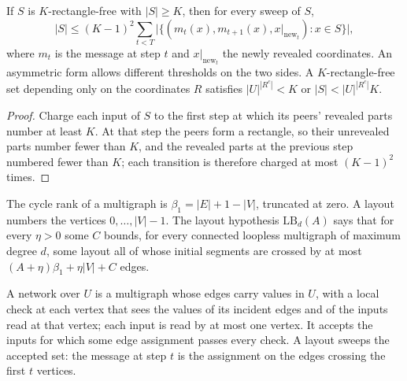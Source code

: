 \begin{lemma}
  \label{lem:lowerbounds-frontier-counting}
  \leanok
  If $S$ is $K$-rectangle-free with $|S|\ge K$, then for every sweep of $S$,
  \[
    |S| \le (K-1)^2 \sum_{t<T} \bigl|\{(m_t(x), m_{t+1}(x), x|_{\text{new}_t}) : x\in S\}\bigr|,
  \]
  where $m_t$ is the message at step $t$ and $x|_{\text{new}_t}$ the newly
  revealed coordinates. An asymmetric form allows different thresholds on the two
  sides. A $K$-rectangle-free set depending only on the coordinates $R$ satisfies
  $|U|^{|R^c|}<K$ or $|S|<|U|^{|R^c|}K$.
\end{lemma}
\begin{proof}
  \leanok
  Charge each input of $S$ to the first step at which its peers' revealed parts
  number at least $K$. At that step the peers form a rectangle, so their
  unrevealed parts number fewer than $K$, and the revealed parts at the previous
  step numbered fewer than $K$; each transition is therefore charged at most
  $(K-1)^2$ times.
\end{proof}

\begin{definition}
  \label{def:lowerbounds-frontier-layout-bound}
  \leanok
  The cycle rank of a multigraph is $\beta_1=|E|+1-|V|$, truncated at zero. A layout
  numbers the vertices $0,\dots,|V|-1$. The layout hypothesis
  $\mathrm{LB}_d(A)$ says that for every $\eta>0$ some $C$ bounds, for every
  connected loopless multigraph of maximum degree $d$, some layout all of whose
  initial segments are crossed by at most $(A+\eta)\beta_1+\eta|V|+C$ edges.
\end{definition}

\begin{definition}
  \label{def:lowerbounds-frontier-network}
  \leanok
  A network over $U$ is a multigraph whose edges carry values in $U$, with a
  local check at each vertex that sees the values of its incident edges and of
  the inputs read at that vertex; each input is read by at most one vertex. It
  accepts the inputs for which some edge assignment passes every check. A layout
  sweeps the accepted set: the message at step $t$ is the assignment on the edges
  crossing the first $t$ vertices.
\end{definition}

